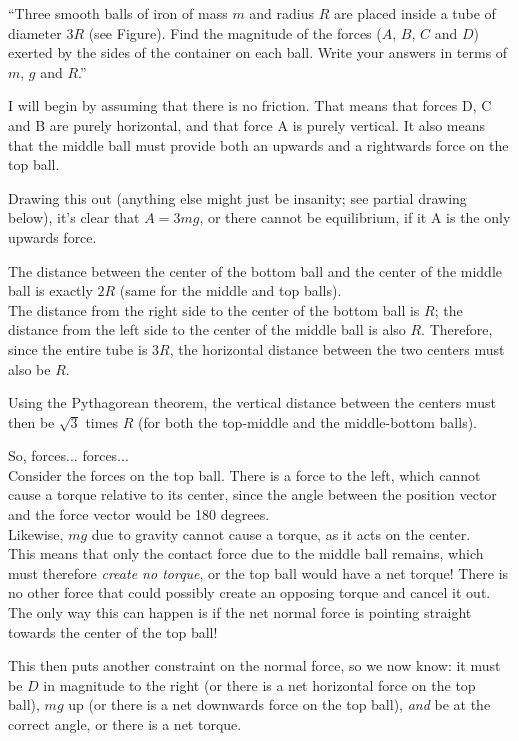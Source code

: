 \documentclass[8.01x]{subfiles}
\begin{document}
``Three smooth balls of iron of mass $m$ and radius $R$ are placed inside a tube of diameter $3 R$ (see Figure). Find the magnitude of the forces ($A$, $B$, $C$ and $D$) exerted by the sides of the container on each ball. Write your answers in terms of $m$, $g$ and $R$.''

I will begin by assuming that there is no friction. That means that forces D, C and B are purely horizontal, and that force A is purely vertical. It also means that the middle ball must provide both an upwards and a rightwards force on the top ball.

Drawing this out (anything else might just be insanity; see partial drawing below), it's clear that $A = 3 m g$, or there cannot be equilibrium, if it A is the only upwards force.

The distance between the center of the bottom ball and the center of the middle ball is exactly $2 R$ (same for the middle and top balls).\\
The distance from the right side to the center of the bottom ball is $R$; the distance from the left side to the center of the middle ball is also $R$. Therefore, since the entire tube is $3 R$, the horizontal distance between the two centers must also be $R$.

Using the Pythagorean theorem, the vertical distance between the centers must then be $\sqrt{3}$ times $R$ (for both the top-middle and the middle-bottom balls).

So, forces... forces...\\
Consider the forces on the top ball. There is a force to the left, which cannot cause a torque relative to its center, since the angle between the position vector and the force vector would be 180 degrees.\\
Likewise, $m g$ due to gravity cannot cause a torque, as it acts on the center.\\
This means that only the contact force due to the middle ball remains, which must therefore \emph{create no torque}, or the top ball would have a net torque! There is no other force that could possibly create an opposing torque and cancel it out.\\
The only way this can happen is if the net normal force is pointing straight towards the center of the top ball!

This then puts another constraint on the normal force, so we now know: it must be $D$ in magnitude to the right (or there is a net horizontal force on the top ball), $m g$ up (or there is a net downwards force on the top ball), \emph{and} be at the correct angle, or there is a net torque.
\end{document}
